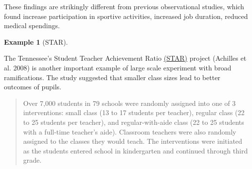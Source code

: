 \documentclass[
  11pt,
  letterpaper,
]{scrbook}
\theoremstyle{definition}
\newtheorem{example}{Example}[chapter]
\theoremstyle{remark}
\begin{document}
These findings are strikingly different from previous observational
studies, which found increase participation in sportive activities,
increased job duration, reduced medical spendings.

\begin{example}[STAR]\protect\hypertarget{exm-Tennesseestar}{}\label{exm-Tennesseestar}

The Tennessee's Student Teacher Achievement Ratio
\href{(https://dss.princeton.edu/catalog/resource1589)}{(STAR)} project
(Achilles et al. 2008) is another important example of large scale
experiment with broad ramifications. The study suggested that smaller
class sizes lead to better outcomes of pupils.

\begin{quote}
Over 7,000 students in 79 schools were randomly assigned into one of 3
interventions: small class (13 to 17 students per teacher), regular
class (22 to 25 students per teacher), and regular-with-aide class (22
to 25 students with a full-time teacher's aide). Classroom teachers were
also randomly assigned to the classes they would teach. The
interventions were initiated as the students entered school in
kindergarten and continued through third grade.
\end{quote}

\end{example}
\end{document}
